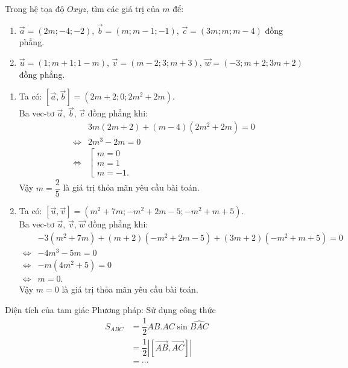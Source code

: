 \begin{bt}%
	Trong hệ tọa độ $Oxyz$, tìm các giá trị của $m$ để:
	\begin{enumerate}
		\item $\overrightarrow{a} = (2m;-4;-2)$, $\overrightarrow{b} = (m;m-1;-1)$, $\overrightarrow{c} = (3m;m;m-4)$ đồng phẳng.
		\item $\overrightarrow{u} = (1;m+1;1-m)$, $\overrightarrow{v} = (m-2;3;m+3)$, $\overrightarrow{w} = (-3;m+2;3m+2)$ đồng phẳng.
	\end{enumerate}
	\loigiai
	{
		\begin{enumerate}
			\item Ta có: $\left[ \overrightarrow{a}, \overrightarrow{b} \right] = \left( 2m+2; 0; 2m^2+2m \right)$.\\
			Ba vec-tơ $\overrightarrow{a}$, $\overrightarrow{b}$, $\overrightarrow{c}$ đồng phẳng khi:
			\begin{align*}
			& 3m(2m+2) + (m-4)(2m^2+2m) = 0 \\
			\Leftrightarrow & 2m^3 - 2m = 0 \\
			\Leftrightarrow & \left[\begin{array}{l} m = 0 \\ m = 1 \\ m = -1.  \end{array} \right.
			\end{align*}
			Vậy $m = \dfrac{2}{5}$ là giá trị thỏa mãn yêu cầu bài toán.
			
			\item Ta có: $\left[ \overrightarrow{u}, \overrightarrow{v} \right] = \left( m^2+7m; -m^2+2m-5; -m^2+m+5 \right)$.\\
			Ba vec-tơ $\overrightarrow{u}$, $\overrightarrow{v}$, $\overrightarrow{w}$ đồng phẳng khi:
			\begin{align*}
			& -3(m^2+7m) + (m+2)(-m^2+2m-5) + (3m+2)(-m^2+m+5) = 0 \\
			\Leftrightarrow & -4m^3 - 5m = 0 \\
			\Leftrightarrow & -m(4m^2 + 5) = 0 \\
			\Leftrightarrow & m = 0.
			\end{align*}
			Vậy $m = 0$ là giá trị thỏa mãn yêu cầu bài toán.
		\end{enumerate}
	}
\end{bt}
\begin{dang}{Diện tích của tam giác}
	Phương pháp: Sử dụng công thức \begin{align*}
	S_{ABC} &=\dfrac{1}{2}AB.AC\sin \widehat{BAC}\\
	&=\dfrac{1}{2}\left| \left[\vec{AB}, \vec{AC}\right]\right| \\
	&=\cdots
	\end{align*}
\end{dang}
